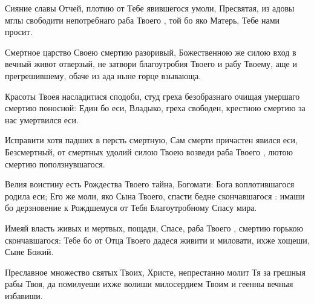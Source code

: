 \begin{mymulticols}
\inyne

Сияние славы Отчей, плотию от Тебе явившегося умоли, Пресвятая, из адовы мглы свободити непотребнаго раба Твоего , той бо яко Матерь, Тебе нами просит. 

\vspace{-\baselineskip}



Смертное царство Своею смертию разоривый, Божественною же силою вход в вечный живот отверзый, не затвори благоутробия Твоего и рабу Твоему, аще и прегрешившему, обаче из ада ныне горце взывающа.


Красоты Твоея насладитися сподоби, студ греха безобразнаго очищая умершаго смертию поносной: Един бо еси, Владыко, греха свободен, крестною смертию за нас умертвился еси.

\slava

Исправити хотя падших в персть смертную, Сам смерти причастен явился еси, Безсмертный, от смертных удолий силою Твоею возведи раба Твоего , лютою смертию поползнувшагося.

\inyne

Велия воистину есть Рождества Твоего тайна, Богомати: Бога воплотившагося родила еси; Его же моли, яко Сына Твоего, спасти бедне скончавшагося : имаши бо дерзновение к Рождшемуся от Тебя Благоутробному Спасу мира. 

\vspace{-\baselineskip}



Имеяй власть живых и мертвых, пощади, Спасе, раба Твоего , смертию горькою скончавшагося: Тебе бо от Отца Твоего дадеся живити и миловати, ихже хощеши, Сыне Божий.


Преславное множество святых Твоих, Христе, непрестанно молит Тя за грешныя рабы Твоя, да помилуеши ихже волиши милосердием Твоим и геенны вечныя избавиши.


\end{mymulticols}
